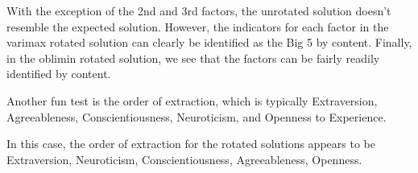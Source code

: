 \documentclass{article}\usepackage[]{graphicx}\usepackage[]{color}
\begin{document}
With the exception of the 2nd and 3rd factors, the unrotated solution doesn't resemble the expected solution. However, the indicators for each factor in the varimax rotated solution can clearly be identified as the Big 5 by content. Finally, in the oblimin rotated solution, we see that the factors can be fairly readily identified by content.  

Another fun test is the order of extraction, which is typically Extraversion, Agreeableness, Conscientiousness, Neuroticism, and Openness to Experience.  

In this case, the order of extraction for the rotated solutions appears to be Extraversion, Neuroticism, Conscientiousness, Agreeableness, Openness. 
\end{document}
